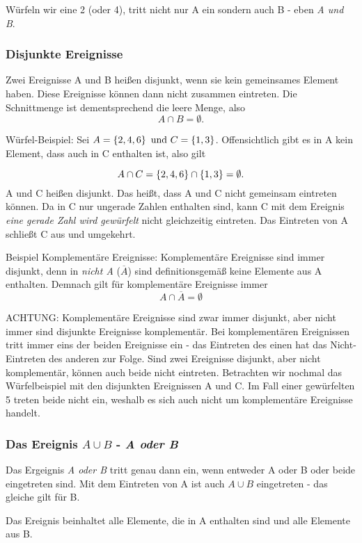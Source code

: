 Würfeln wir eine 2 (oder 4), tritt nicht nur A ein sondern auch B - eben \emph{A und B}.

\subsubsection{Disjunkte Ereignisse}

Zwei Ereignisse A und B heißen disjunkt, wenn sie kein gemeinsames Element haben. Diese Ereignisse können dann nicht zusammen eintreten. Die Schnittmenge ist dementsprechend die leere Menge, also $$A\cap B = \emptyset.$$

Würfel-Beispiel: Sei $A=\gkl{2,4,6}\ \text{und}\  C=\gkl{1,3}$. Offensichtlich gibt es in A kein Element, dass auch in C enthalten ist, also gilt

$$A\cap C = \gkl{2,4,6}\cap \gkl{1,3} = \emptyset.$$ A und C heißen disjunkt. Das heißt, dass A und C nicht gemeinsam eintreten können. Da in C nur ungerade Zahlen enthalten sind, kann C mit dem Ereignis \emph{eine gerade Zahl wird gewürfelt} nicht gleichzeitig eintreten. Das Eintreten von A schließt C aus und umgekehrt.

Beispiel Komplementäre Ereignisse: Komplementäre Ereignisse sind immer disjunkt, denn in \emph{nicht A} ($\overline{A}$) sind definitionsgemäß keine Elemente aus A enthalten. Demnach gilt für komplementäre Ereignisse immer
$$A\cap \overline{A} = \emptyset$$

ACHTUNG: Komplementäre Ereignisse sind zwar immer disjunkt, aber nicht immer sind disjunkte Ereignisse komplementär. Bei komplementären Ereignissen tritt immer eins der beiden Ereignisse ein - das Eintreten des einen hat das Nicht-Eintreten des anderen zur Folge. Sind zwei Ereignisse disjunkt, aber nicht komplementär, können auch beide nicht eintreten. 
Betrachten wir nochmal das Würfelbeispiel mit den disjunkten Ereignissen A und C. Im Fall einer gewürfelten 5 treten beide nicht ein, weshalb es sich auch nicht um komplementäre Ereignisse handelt.

\subsubsection{Das Ereignis $A\cup B$ - \emph{A oder B}}
Das Ergeignis \emph{A oder B} tritt genau dann ein, wenn entweder A oder B oder beide eingetreten sind. Mit dem Eintreten von A ist auch $A\cup B$ eingetreten - das gleiche gilt für B. 

Das Ereignis beinhaltet alle Elemente, die in A enthalten sind und alle Elemente aus B. 

